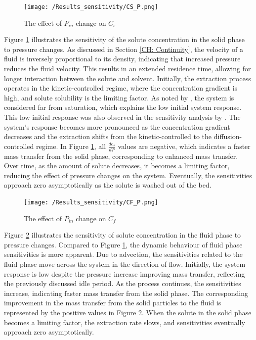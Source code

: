\documentclass[a4paper,fleqn]{cas-dc}
\begin{document}
	\begin{figure}[!ht]
		\centering
		\texttt{[image: /Results\_sensitivity/CS\_P.png]}
		\caption{The effect of $P_{in}$ change on $C_s$}
		\label{fig:Sensitivty_P_CS}
	\end{figure}
	
	Figure \ref{fig:Sensitivty_P_CS} illustrates the sensitivity of the solute concentration in the solid phase to pressure changes. As discussed in Section \ref{CH: Continuity}, the velocity of a fluid is inversely proportional to its density, indicating that increased pressure reduces the fluid velocity. This results in an extended residence time, allowing for longer interaction between the solute and solvent. Initially, the extraction process operates in the kinetic-controlled regime, where the concentration gradient is high, and solute solubility is the limiting factor. As noted by \citet{Sliczniuk2024}, the system is considered far from saturation, which explains the low initial system response. This low initial response was also observed in the sensitivity analysis by \citet{Fiori_2007}. The system's response becomes more pronounced as the concentration gradient decreases and the extraction shifts from the kinetic-controlled to the diffusion-controlled regime. In Figure \ref{fig:Sensitivty_P_CS}, all $\frac{dc_s}{dP}$ values are negative, which indicates a faster mass transfer from the solid phase, corresponding to enhanced mass transfer.  Over time, as the amount of solute decreases, it becomes a limiting factor, reducing the effect of pressure changes on the system. Eventually, the sensitivities approach zero asymptotically as the solute is washed out of the bed.
	
	\begin{figure}[!ht]
		\centering
		\texttt{[image: /Results\_sensitivity/CF\_P.png]}
		\caption{The effect of $P_{in}$ change on $C_f$}
		\label{fig:Sensitivty_P_CF}
	\end{figure}
	
	
	Figure \ref{fig:Sensitivty_P_CF} illustrates the sensitivity of solute concentration in the fluid phase to pressure changes. Compared to Figure \ref{fig:Sensitivty_P_CS}, the dynamic behaviour of fluid phase sensitivities is more apparent. Due to advection, the sensitivities related to the fluid phase move across the system in the direction of flow. Initially, the system response is low despite the pressure increase improving mass transfer, reflecting the previously discussed idle period. As the process continues, the sensitivities increase, indicating faster mass transfer from the solid phase. The corresponding improvement in the mass transfer from the solid particles to the fluid is represented by the positive values in Figure \ref{fig:Sensitivty_P_CF}. When the solute in the solid phase becomes a limiting factor, the extraction rate slows, and sensitivities eventually approach zero asymptotically.
	
\end{document}
